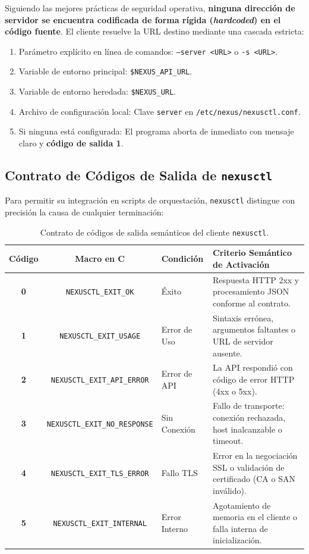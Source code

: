 \documentclass[10pt,a4paper]{article}
\begin{document}
Siguiendo las mejores prácticas de seguridad operativa, \textbf{ninguna dirección de servidor se encuentra codificada de forma rígida (\textit{hardcoded}) en el código fuente}. El cliente resuelve la URL destino mediante una cascada estricta:
\begin{enumerate}[leftmargin=*]
    \item Parámetro explícito en línea de comandos: \texttt{--server <URL>} o \texttt{-s <URL>}.
    \item Variable de entorno principal: \texttt{\$NEXUS\_API\_URL}.
    \item Variable de entorno heredada: \texttt{\$NEXUS\_URL}.
    \item Archivo de configuración local: Clave \texttt{server} en \texttt{/etc/nexus/nexusctl.conf}.
    \item Si ninguna está configurada: El programa aborta de inmediato con mensaje claro y \textbf{código de salida 1}.
\end{enumerate}

\subsection{Contrato de Códigos de Salida de \texttt{nexusctl}}

Para permitir su integración en scripts de orquestación, \texttt{nexusctl} distingue con precisión la causa de cualquier terminación:

\begin{table}[H]
    \centering
    \footnotesize
    \caption{Contrato de códigos de salida semánticos del cliente \texttt{nexusctl}.}
    \label{tab:nexusctl_exit_codes}
    \begin{tabularx}{\textwidth}{cclX}
        \toprule
        \rowcolor{tableheader}
        \textbf{Código} & \textbf{Macro en C} & \textbf{Condición} & \textbf{Criterio Semántico de Activación} \\
        \midrule
        \textbf{0} & \texttt{NEXUSCTL\_EXIT\_OK} & Éxito & Respuesta HTTP 2xx y procesamiento JSON conforme al contrato. \\
        \rowcolor{rowalt}
        \textbf{1} & \texttt{NEXUSCTL\_EXIT\_USAGE} & Error de Uso & Sintaxis errónea, argumentos faltantes o URL de servidor ausente. \\
        \textbf{2} & \texttt{NEXUSCTL\_EXIT\_API\_ERROR} & Error de API & La API respondió con código de error HTTP (4xx o 5xx). \\
        \rowcolor{rowalt}
        \textbf{3} & \texttt{NEXUSCTL\_EXIT\_NO\_RESPONSE} & Sin Conexión & Fallo de transporte: conexión rechazada, host inalcanzable o timeout. \\
        \textbf{4} & \texttt{NEXUSCTL\_EXIT\_TLS\_ERROR} & Fallo TLS & Error en la negociación SSL o validación de certificado (CA o SAN inválido). \\
        \rowcolor{rowalt}
        \textbf{5} & \texttt{NEXUSCTL\_EXIT\_INTERNAL} & Error Interno & Agotamiento de memoria en el cliente o falla interna de inicialización. \\
        \bottomrule
    \end{tabularx}
\end{table}
\end{document}

